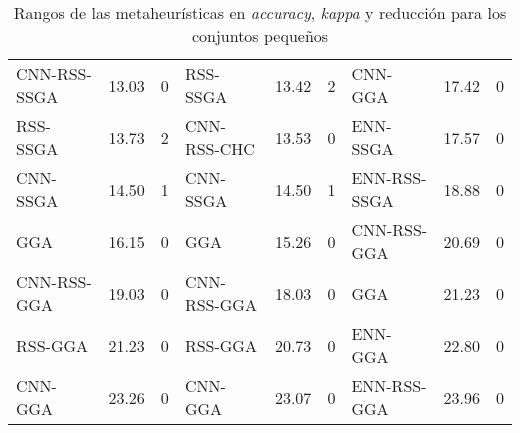 \begin{table}[]
\begin{adjustbox}{max width =\textwidth}
\begin{tabular}{l c c|l c c|l c c}
CNN-RSS-SSGA & 13.03 & 0 & RSS-SSGA     & 13.42 & 2 & CNN-GGA      & 17.42 & 0  \\
RSS-SSGA     & 13.73 & 2 & CNN-RSS-CHC  & 13.53 & 0 & ENN-SSGA     & 17.57 & 0  \\ 
CNN-SSGA     & 14.50 & 1 & CNN-SSGA     & 14.50 & 1 & ENN-RSS-SSGA & 18.88 & 0  \\ 
GGA          & 16.15 & 0 & GGA          & 15.26 & 0 & CNN-RSS-GGA  & 20.69 & 0  \\
CNN-RSS-GGA  & 19.03 & 0 & CNN-RSS-GGA  & 18.03 & 0 & GGA          & 21.23 & 0  \\
RSS-GGA      & 21.23 & 0 & RSS-GGA      & 20.73 & 0 & ENN-GGA      & 22.80 & 0  \\
CNN-GGA      & 23.26 & 0 & CNN-GGA      & 23.07 & 0 & ENN-RSS-GGA  & 23.96 & 0  \\


\hline
\end{tabular}
\end{adjustbox}
\caption{Rangos de las metaheurísticas en \emph{accuracy}, \emph{kappa} y reducción para los conjuntos pequeños}
\label{rank1-peq}
\end{table} 

